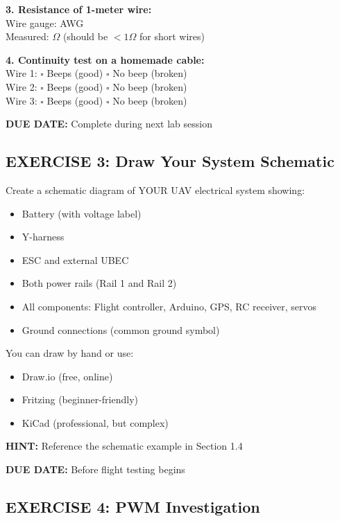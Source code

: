 \documentclass[11pt,letterpaper]{article}
\begin{document}
\textbf{3. Resistance of 1-meter wire:}\\
Wire gauge: \underline{\hspace{3cm}} AWG\\
Measured: \underline{\hspace{3cm}} $\Omega$ (should be $< 1\Omega$ for short wires)

\textbf{4. Continuity test on a homemade cable:}\\
Wire 1: $\square$ Beeps (good) \quad $\square$ No beep (broken)\\
Wire 2: $\square$ Beeps (good) \quad $\square$ No beep (broken)\\
Wire 3: $\square$ Beeps (good) \quad $\square$ No beep (broken)

\textbf{DUE DATE:} Complete during next lab session

\subsection*{EXERCISE 3: Draw Your System Schematic}

Create a schematic diagram of YOUR UAV electrical system showing:
\begin{itemize}
\item Battery (with voltage label)
\item Y-harness
\item ESC and external UBEC
\item Both power rails (Rail 1 and Rail 2)
\item All components: Flight controller, Arduino, GPS, RC receiver, servos
\item Ground connections (common ground symbol)
\end{itemize}

You can draw by hand or use:
\begin{itemize}
\item Draw.io (free, online)
\item Fritzing (beginner-friendly)
\item KiCad (professional, but complex)
\end{itemize}

\textbf{HINT:} Reference the schematic example in Section 1.4

\textbf{DUE DATE:} Before flight testing begins

\subsection*{EXERCISE 4: PWM Investigation}
\end{document}
